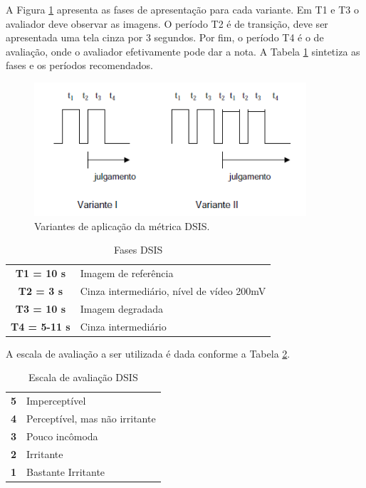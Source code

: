 A Figura \ref{fig:dsisvariantes} apresenta as fases de apresentação para cada variante. Em T1 e T3 o avaliador deve observar as imagens. O período T2 é de transição, deve ser apresentada uma tela cinza por 3 segundos. Por fim, o período T4 é o de avaliação, onde o avaliador efetivamente pode dar a nota. A Tabela \ref{tab:dsisfases} sintetiza as fases e os períodos recomendados.

\begin{figure}[!htb]
	\centering
	\includegraphics[width=0.9\textwidth]{./imgs/dsisvariantes.png}
	\caption{Variantes de aplicação da métrica DSIS.}
	\label{fig:dsisvariantes}
\end{figure}

\begin{table}[!h]
	\centering
	\caption{Fases DSIS}
	\label{tab:dsisfases}
	\begin{tabular}{c|l}
		\hline
		\textbf{T1 = 10 s} & Imagem de referência \\
		\textbf{T2 = 3 s} & Cinza intermediário, nível de vídeo 200mV \\
		\textbf{T3 = 10 s} & Imagem degradada \\
		\textbf{T4 = 5-11 s} & Cinza intermediário \\
		\hline
	\end{tabular}
\end{table}

A escala de avaliação a ser utilizada é dada conforme a Tabela \ref{tab:dsisescala}.

\begin{table}[!h]
	\centering
	\caption{Escala de avaliação DSIS}
	\label{tab:dsisescala}
	\begin{tabular}{c|l}
		\hline
		\textbf{5} & Imperceptível \\
		\textbf{4} & Perceptível, mas não irritante \\
		\textbf{3} & Pouco incômoda \\
		\textbf{2} & Irritante \\
		\textbf{1} & Bastante Irritante \\
		\hline
	\end{tabular}
\end{table}

